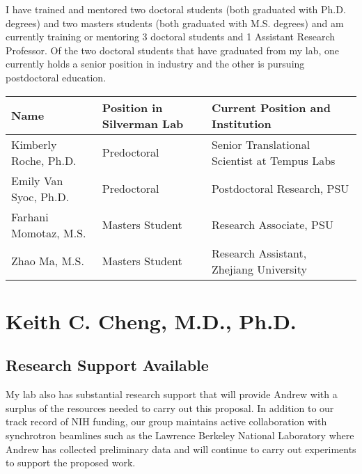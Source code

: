 \documentclass{NIHGrant}
\begin{document}
I have trained and mentored two doctoral students (both graduated with Ph.D. degrees) and two masters students (both graduated with M.S. degrees) and am currently training or mentoring 3 doctoral students and 1 Assistant Research Professor. Of the two doctoral students that have graduated from my lab, one currently holds a senior position in industry and the other is pursuing postdoctoral education. 

\begin{center}
\renewcommand{\arraystretch}{1.3}
  \fontsize{9pt}{9pt}\selectfont
  \begin{tabular}{| l | p{2in} | p{3in} |}
    \hline
    \textbf{Name} & \textbf{Position in Silverman Lab} & \textbf{Current Position and Institution} \\
    \hline
    Kimberly Roche, Ph.D. & Predoctoral & Senior Translational Scientist at Tempus Labs \\
    \hline
    Emily Van Syoc, Ph.D. & Predoctoral &  Postdoctoral Research, PSU \\
    \hline
    Farhani Momotaz, M.S. & Masters Student & Research Associate, PSU \\
    \hline 
    Zhao Ma, M.S. & Masters Student & Research Assistant, Zhejiang University\\
    \hline
  \end{tabular}

\end{center}

\section*{Keith C. Cheng, M.D., Ph.D. }

\subsection*{Research Support Available}

My lab also has substantial research support that will provide Andrew with a surplus of the resources needed to carry out this proposal. In addition to our track record of NIH funding, our group maintains active collaboration with synchrotron beamlines such as the Lawrence Berkeley National Laboratory where Andrew has collected preliminary data and will continue to carry out experiments to support the proposed work.
\end{document}

